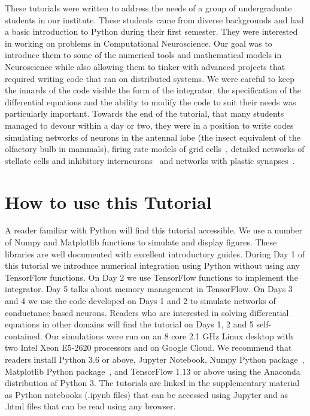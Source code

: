 \documentclass[10pt,letterpaper]{article}
\begin{document}
\begin{nolinenumbers}
These tutorials were written to address the needs of a group of undergraduate students in our institute. These students came from diverse backgrounds and had a basic introduction to Python during their first semester. They were interested in working on problems in Computational Neuroscience. Our goal was to introduce them to some of the numerical tools and mathematical models in Neuroscience while also allowing them to tinker with advanced projects that required writing code that ran on distributed systems. We were careful to keep the innards of the code visible \textemdash the form of the integrator, the specification of the differential equations and the ability to modify the code to suit their needs was particularly important. Towards the end of the tutorial, that many students managed to devour within a day or two, they were in a position to write codes simulating networks of neurons in the antennal lobe  \cite{Bazhenov2001}  (the insect equivalent of the olfactory bulb in mammals), firing rate models of grid cells~\cite{Burak2009}, detailed networks of stellate cells and inhibitory interneurons~\cite{Neru2019} and networks with plastic synapses~\cite{Bazhenov2005}. 


\section*{How to use this Tutorial}
A reader familiar with Python will find this tutorial accessible. We use a number of Numpy and Matplotlib functions to simulate and display figures. These libraries are well documented with excellent introductory guides. During Day 1 of this tutorial we introduce numerical integration using Python without using any TensorFlow functions. On Day 2 we use TensorFlow functions to implement the integrator. Day 5 talks about memory management in TensorFlow. On Days 3 and 4 we use the code developed on Days 1 and 2 to simulate networks of conductance based neurons. Readers who are interested in solving differential equations in other domains will find the tutorial on Days 1, 2 and 5 self-contained.  Our simulations were run on an 8 core 2.1 GHz Linux desktop with two Intel Xeon E5-2620 processors  and on Google Cloud. We recommend that readers install Python 3.6 or above, Jupyter Notebook, Numpy Python package~\cite{numpy}, Matplotlib Python package~\cite{matplotlib}, and TensorFlow 1.13 or above using the Anaconda distribution of Python 3. The tutorials are linked in the supplementary material as Python notebooks (.ipynb files) that can be accessed using Jupyter and as .html files that can be read using any browser.


\end{nolinenumbers}
\end{document}
